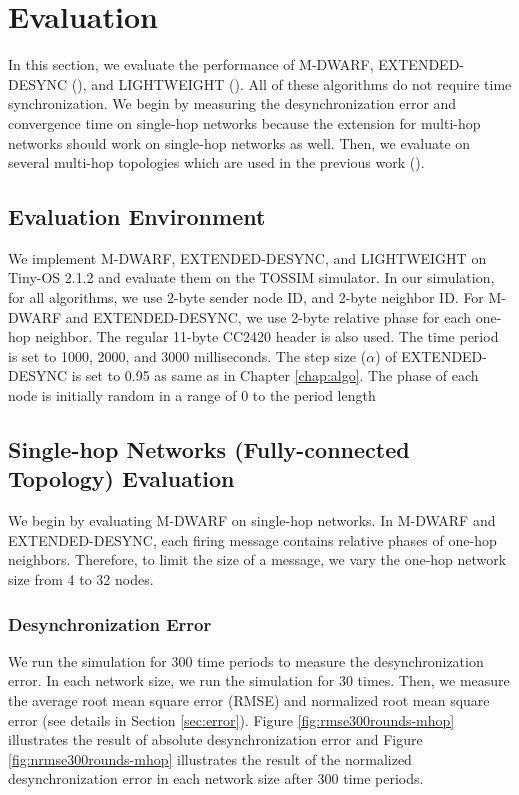 \section{Evaluation}
\label{sec:multihop-evaluation}
In this section, we evaluate the performance of M-DWARF, EXTENDED-DESYNC (\cite{MK09DESYNC}), and LIGHTWEIGHT (\cite{5062165}). All of these algorithms do not require time synchronization. We begin by measuring the desynchronization error and convergence time on single-hop networks because the extension for multi-hop networks should work on single-hop networks as well. Then, we evaluate on several multi-hop topologies which are used in the previous work (\cite{4663417}).

\subsection{Evaluation Environment}
We implement M-DWARF, EXTENDED-DESYNC, and LIGHTWEIGHT on Tiny-OS 2.1.2 and evaluate them on the TOSSIM simulator.
In our simulation, for all algorithms, we use 2-byte sender node ID, and 2-byte neighbor ID. For M-DWARF and EXTENDED-DESYNC, we use 2-byte relative phase for each one-hop neighbor. The regular 11-byte CC2420 header is also used.
The time period is set to 1000, 2000, and 3000 milliseconds.
The step size ($\alpha$) of EXTENDED-DESYNC is set to 0.95 as same as in Chapter \ref{chap:algo}.
The phase of each node is initially random in a range of 0 to the period length 


\subsection{Single-hop Networks (Fully-connected Topology) Evaluation}
We begin by evaluating M-DWARF on single-hop networks. In M-DWARF and EXTENDED-DESYNC, each firing message contains relative phases of one-hop neighbors. Therefore, to limit the size of a message, we vary the one-hop network size from 4 to 32 nodes.

\subsubsection{Desynchronization Error}
We run the simulation for 300 time periods to measure the desynchronization error. 
In each network size, we run the simulation for 30 times.
Then, we measure the average root mean square error (RMSE) and normalized root mean square error (see details in Section \ref{sec:error}). 
Figure  \ref{fig:rmse300rounds-mhop} illustrates the result of absolute desynchronization error and Figure \ref{fig:nrmse300rounds-mhop} illustrates the result of the normalized desynchronization error in each network size after 300 time periods.

